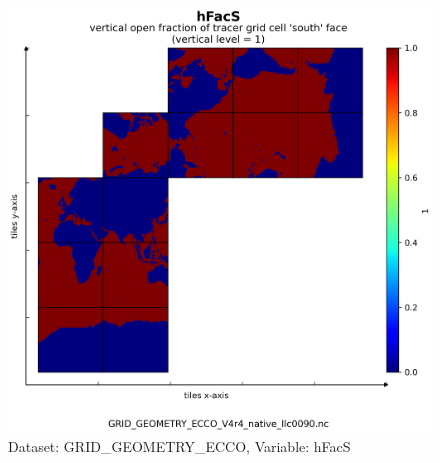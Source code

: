 \begin{figure}[H]
\centering
\includegraphics[scale=0.55]{../images/plots/v4r4/native_plots_coords/Geometry_Parameters_for_the_Lat-Lon-Cap_90_(llc90)_Native_Model_Grid_(Version_4_Release_4)/hFacS.png}
\caption{Dataset: GRID\_GEOMETRY\_ECCO, Variable: hFacS}
\label{tab:table-GRID_GEOMETRY_ECCO_hFacS-Plot}
\end{figure}
\newpage
\pagebreak
